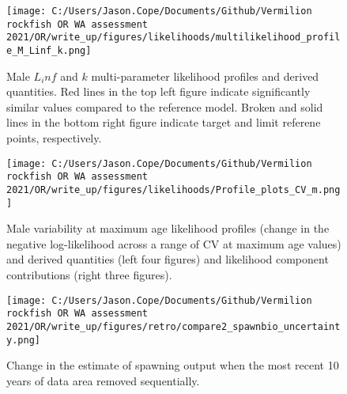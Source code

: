 \documentclass[11pt,
  english,
  a4paper,
]{article}
\begin{document}
\begin{figure}
\centering
\texttt{[image: C:/Users/Jason.Cope/Documents/Github/Vermilion rockfish OR WA assessment 2021/OR/write\_up/figures/likelihoods/multilikelihood\_profile\_M\_Linf\_k.png]}
\caption{Male {\(L_inf\)\leavevmode\tagmcend\tagstructend} and {\(k\)\leavevmode\tagmcend\tagstructend} multi-parameter likelihood profiles and derived quantities. Red lines in the top left figure indicate significantly similar values compared to the reference model. Broken and solid lines in the bottom right figure indicate target and limit referene points, respectively.\label{fig:Linf_k_m-profile}}
\end{figure}

\tagmcend\tagstructend


\begin{figure}
\centering
\texttt{[image: C:/Users/Jason.Cope/Documents/Github/Vermilion rockfish OR WA assessment 2021/OR/write\_up/figures/likelihoods/Profile\_plots\_CV\_m.png]}
\caption{Male variability at maximum age likelihood profiles (change in the negative log-likelihood across a range of CV at maximum age values) and derived quantities (left four figures) and likelihood component contributions (right three figures).\label{fig:CVold_m-profile-combo}}
\end{figure}

\tagmcend\tagstructend


\begin{figure}
\centering
\texttt{[image: C:/Users/Jason.Cope/Documents/Github/Vermilion rockfish OR WA assessment 2021/OR/write\_up/figures/retro/compare2\_spawnbio\_uncertainty.png]}
\caption{Change in the estimate of spawning output when the most recent 10 years of data area removed sequentially.\label{fig:retro-ssb}}
\end{figure}
\end{document}
